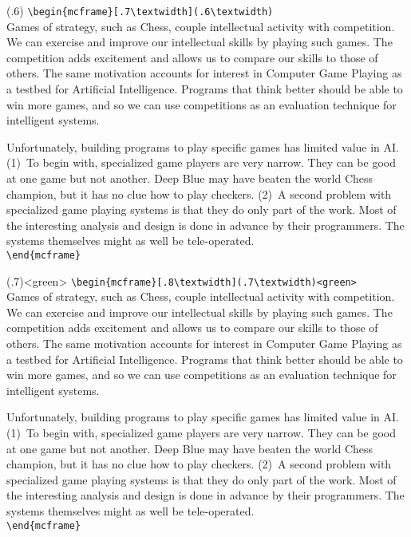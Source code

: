 \begin{mcframe}[.7\textwidth](.6\textwidth)
\verb+\begin{mcframe}[.7\textwidth](.6\textwidth)+\\
Games of strategy, such as Chess, couple intellectual activity with
competition.
We can exercise and improve our intellectual skills by playing such games.
The competition adds excitement and allows us to
compare our skills to those of others.
The same motivation accounts for
interest in Computer Game Playing as a testbed for Artificial Intelligence.
Programs that think better should be able to win more
games, and so we can use competitions as an evaluation technique for
intelligent systems.

Unfortunately, building programs to play specific games has limited
value in AI.  (1)~To begin with, specialized game players are very narrow.
They can be good at one game but not another. Deep Blue may have beaten
the world Chess champion, but it has no clue how to play checkers.  (2)~A
second problem with specialized game playing systems is that they do only
part of the work. Most of the interesting analysis and design is done in
advance by their programmers. The systems themselves might as well be
tele-operated.\\
\verb+\end{mcframe}+
\end{mcframe}

\begin{mcframe}[.8\textwidth](.7\textwidth)<green>
\verb+\begin{mcframe}[.8\textwidth](.7\textwidth)<green>+\\
Games of strategy, such as Chess, couple intellectual activity with
competition.
We can exercise and improve our intellectual skills by playing such games.
The competition adds excitement and allows us to
compare our skills to those of others.
The same motivation accounts for
interest in Computer Game Playing as a testbed for Artificial Intelligence.
Programs that think better should be able to win more
games, and so we can use competitions as an evaluation technique for
intelligent systems.

Unfortunately, building programs to play specific games has limited
value in AI.  (1)~To begin with, specialized game players are very narrow.
They can be good at one game but not another. Deep Blue may have beaten
the world Chess champion, but it has no clue how to play checkers.  (2)~A
second problem with specialized game playing systems is that they do only
part of the work. Most of the interesting analysis and design is done in
advance by their programmers. The systems themselves might as well be
tele-operated.\\
\verb+\end{mcframe}+
\end{mcframe}

\clearpage

